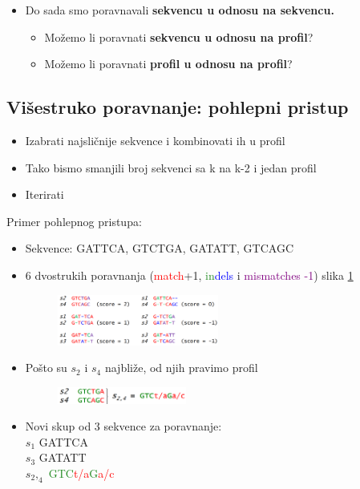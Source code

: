 \begin{itemize}
    \item Do sada smo poravnavali \textbf{sekvencu u odnosu na sekvencu.}
    \begin{itemize}
        \item Možemo li poravnati \textbf{sekvencu u odnosu na profil}?
        \item Možemo li poravnati \textbf{profil u odnosu na profil}?
    \end{itemize}
   
\end{itemize}


\subsection{Višestruko poravnanje: pohlepni pristup}

\begin{itemize}
    \item Izabrati najsličnije sekvence i kombinovati ih u profil
     \item Tako bismo smanjili broj sekvenci sa k na k-2 i jedan profil
    \item Iterirati
\end{itemize}

Primer pohlepnog pristupa:
\begin{itemize}
    \item Sekvence: GATTCA, GTCTGA, GATATT, GTCAGC
    \item 6 dvostrukih poravnanja (\textcolor{red}{match}+1, \textcolor{ForestGreen}{in}\textcolor{blue}{dels} i \textcolor{purple}{mismatches -1}) slika \ref{slika:sestDvostrukih}
    \begin{figure}[h!]
    \centering
    \includegraphics[width=0.5\textwidth]{poglavlja/5/slike/sestDvostrukih.png}
    \caption{}
    \label{slika:sestDvostrukih}
    \end{figure}
    \item Pošto su $s_2$ i $s_4$ najbliže, od njih pravimo profil
    
     \begin{figure}[h!]
    \centering
    \includegraphics[width=0.4\textwidth]{poglavlja/5/slike/profil.png}
    \caption{}
    \label{slika:profil}
    \end{figure}
    \item Novi skup od 3 sekvence za poravnanje:\\
            $s_1$ GATTCA\\
            $s_3$ GATATT\\
            $s_2,_4$ \textcolor{ForestGreen}{GTC}\textcolor{red}{t/a}\textcolor{ForestGreen}{G}\textcolor{red}{a/c}

\end{itemize}


